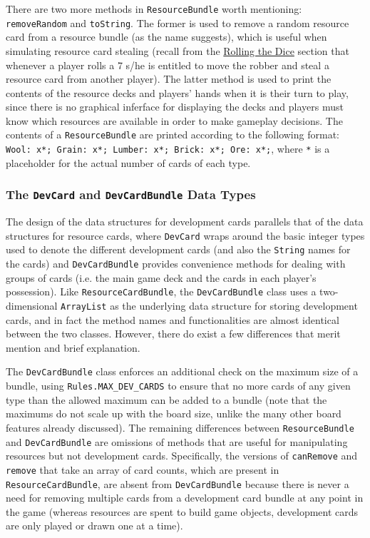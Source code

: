 \documentclass[pageno]{jpaper}
\begin{document}
\begin{doublespacing}
There are two more methods in \lstinline$ResourceBundle$ worth mentioning: \lstinline$removeRandom$ and \lstinline$toString$. The former is used to remove a random resource card from a resource bundle (as the name suggests), which is useful when simulating resource card stealing (recall from the \hyperlink{sec:rolling_the_dice}{Rolling the Dice} section that whenever a player rolls a 7 s/he is entitled to move the robber and steal a resource card from another player). The latter method is used to print the contents of the resource decks and players' hands when it is their turn to play, since there is no graphical inferface for displaying the decks and players must know which resources are available in order to make gameplay decisions. The contents of a \lstinline$ResourceBundle$ are printed according to the following format: \lstinline$Wool: x*; Grain: x*; Lumber: x*; Brick: x*; Ore: x*;$, where \lstinline$*$ is a placeholder for the actual number of cards of each type.

\hypertarget{sec:the_devcard_and_devcardbundle_data_types}{}
\subsubsection{The \lstinline$DevCard$ and \lstinline$DevCardBundle$ Data Types}

The design of the data structures for development cards parallels that of the data structures for resource cards, where \lstinline$DevCard$ wraps around the basic integer types used to denote the different development cards (and also the \lstinline$String$ names for the cards) and \lstinline$DevCardBundle$ provides convenience methods for dealing with groups of cards (i.e. the main game deck and the cards in each player's possession). Like \lstinline$ResourceCardBundle$, the \lstinline$DevCardBundle$ class uses a two-dimensional \lstinline$ArrayList$ as the underlying data structure for storing development cards, and in fact the method names and functionalities are almost identical between the two classes. However, there do exist a few differences that merit mention and brief explanation.

The \lstinline$DevCardBundle$ class enforces an additional check on the maximum size of a bundle, using \lstinline$Rules.MAX_DEV_CARDS$ to ensure that no more cards of any given type than the allowed maximum can be added to a bundle (note that the maximums do not scale up with the board size, unlike the many other board features already discussed). The remaining differences between \lstinline$ResourceBundle$ and \lstinline$DevCardBundle$ are omissions of methods that are useful for manipulating resources but not development cards. Specifically, the versions of \lstinline$canRemove$ and \lstinline$remove$ that take an array of card counts, which are present in \lstinline$ResourceCardBundle$, are absent from \lstinline$DevCardBundle$ because there is never a need for removing multiple cards from a development card bundle at any point in the game (whereas resources are spent to build game objects, development cards are only played or drawn one at a time).


\end{doublespacing}
\end{document}
